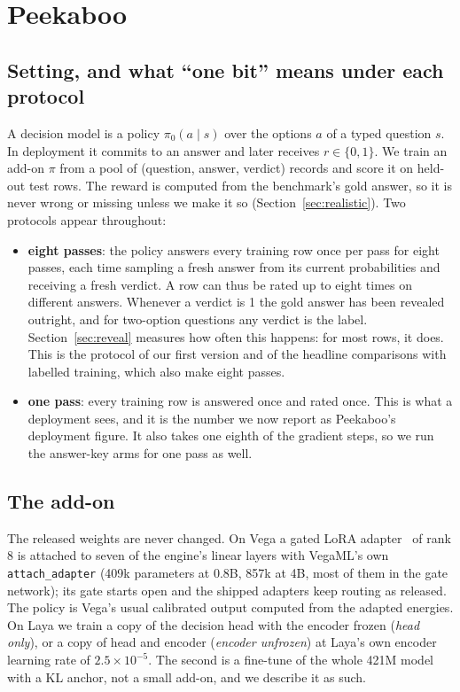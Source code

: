 \documentclass[11pt]{article}
\newcommand{\pk}{Peekaboo}
\begin{document}
\section{\pk{}}
\label{sec:method}

\subsection{Setting, and what ``one bit'' means under each protocol}
A decision model is a policy $\pi_0(a\mid s)$ over the options $a$ of a typed question $s$. In deployment it commits to an answer and later receives $r\in\{0,1\}$. We train an add-on $\pi$ from a pool of (question, answer, verdict) records and score it on held-out test rows. The reward is computed from the benchmark's gold answer, so it is never wrong or missing unless we make it so (Section~\ref{sec:realistic}). Two protocols appear throughout:
\begin{itemize}
\item \textbf{eight passes}: the policy answers every training row once per pass for eight passes, each time sampling a fresh answer from its current probabilities and receiving a fresh verdict. A row can thus be rated up to eight times on different answers. Whenever a verdict is 1 the gold answer has been revealed outright, and for two-option questions any verdict is the label. Section~\ref{sec:reveal} measures how often this happens: for most rows, it does. This is the protocol of our first version and of the headline comparisons with labelled training, which also make eight passes.
\item \textbf{one pass}: every training row is answered once and rated once. This is what a deployment sees, and it is the number we now report as \pk{}'s deployment figure. It also takes one eighth of the gradient steps, so we run the answer-key arms for one pass as well.
\end{itemize}

\subsection{The add-on}
The released weights are never changed. On Vega a gated LoRA adapter~\citep{hu2022lora} of rank 8 is attached to seven of the engine's linear layers with VegaML's own \texttt{attach\_adapter} (409k parameters at 0.8B, 857k at 4B, most of them in the gate network); its gate starts open and the shipped adapters keep routing as released. The policy is Vega's usual calibrated output computed from the adapted energies. On Laya we train a copy of the decision head with the encoder frozen (\emph{head only}), or a copy of head and encoder (\emph{encoder unfrozen}) at Laya's own encoder learning rate of $2.5\times10^{-5}$. The second is a fine-tune of the whole 421M model with a KL anchor, not a small add-on, and we describe it as such.
\end{document}
